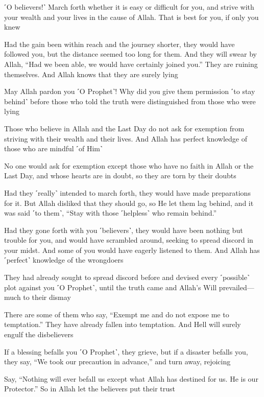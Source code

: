 ˹O believers!˺ March forth whether it is easy or difficult for you, and strive with your wealth and your lives in the cause of Allah. That is best for you, if only you knew

Had the gain been within reach and the journey shorter, they would have followed you, but the distance seemed too long for them. And they will swear by Allah, “Had we been able, we would have certainly joined you.” They are ruining themselves. And Allah knows that they are surely lying

May Allah pardon you ˹O Prophet˺! Why did you give them permission ˹to stay behind˺ before those who told the truth were distinguished from those who were lying

Those who believe in Allah and the Last Day do not ask for exemption from striving with their wealth and their lives. And Allah has perfect knowledge of those who are mindful ˹of Him˺

No one would ask for exemption except those who have no faith in Allah or the Last Day, and whose hearts are in doubt, so they are torn by their doubts

Had they ˹really˺ intended to march forth, they would have made preparations for it. But Allah disliked that they should go, so He let them lag behind, and it was said ˹to them˺, “Stay with those ˹helpless˺ who remain behind.”

Had they gone forth with you ˹believers˺, they would have been nothing but trouble for you, and would have scrambled around, seeking to spread discord in your midst. And some of you would have eagerly listened to them. And Allah has ˹perfect˺ knowledge of the wrongdoers

They had already sought to spread discord before and devised every ˹possible˺ plot against you ˹O Prophet˺, until the truth came and Allah’s Will prevailed—much to their dismay

There are some of them who say, “Exempt me and do not expose me to temptation.” They have already fallen into temptation. And Hell will surely engulf the disbelievers

If a blessing befalls you ˹O Prophet˺, they grieve, but if a disaster befalls you, they say, “We took our precaution in advance,” and turn away, rejoicing

Say, “Nothing will ever befall us except what Allah has destined for us. He is our Protector.” So in Allah let the believers put their trust

